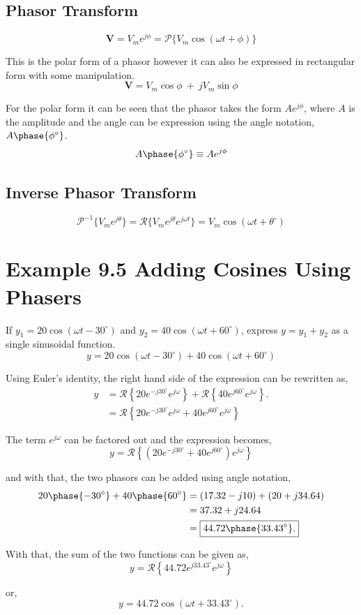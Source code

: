 \documentclass[12pt]{article}
\begin{document}
    \subsection*{Phasor Transform}
    \[
        \textbf{V} = V_m e^{j \phi} = \mathscr{P} \{V_m \cos (\omega t + \phi)\}
    \]
    \par This is the polar form of a phasor however it can also be expressed in
    rectangular form with some manipulation.
    \[
        \textbf{V} = V_m \cos \phi\ +\ j V_m \sin \phi
    \]
    \par For the polar form it can be seen that the phasor takes the form
    $Ae^{j \phi}$, where $A$ is the amplitude and the angle can be expression
    using the angle notation, $A \phase{\phi^{\circ}}$.
    \[
        A \phase{\phi^{\circ}} \equiv A e^{j \phi}
    \]
    \subsection*{Inverse Phasor Transform}
    \[
        \mathscr{P}^{-1} \{V_m e^{j \theta}\} = \mathscr{R} \{V_m e^{j \theta}
        e^{j \omega t}\} = V_m \cos (\omega t + \theta^{\circ})
    \]
    \section*{Example 9.5 Adding Cosines Using Phasers}
    If $y_1 = 20 \cos (\omega t - 30^{\circ})$ and $y_2 = 40 \cos (\omega t +
    60^{\circ})$, express $y = y_1 + y_2$ as a single sinusoidal function.
    \[
        y = 20 \cos (\omega t - 30^{\circ}) + 40 \cos (\omega t + 60^{\circ})
    \]
    \par Using Euler's identity, the right hand side of the expression can be
    rewritten as,
    \begin{align*}
        y &= \mathscr{R} \left\{ 20 e^{-j 30^{\circ}} e^{j \omega} \right\} +
          \mathscr{R} \left\{ 40 e^{j 60^{\circ}} e^{j \omega} \right\}. \\
          &= \mathscr{R} \left\{ 20 e^{-j 30^{\circ}} e^{j \omega} + 40 e^{j
          60^{\circ}} e^{j \omega} \right\}
    \end{align*}
    \par The term $e^{j \omega}$ can be factored out and the expression becomes,
    \[
        y = \mathscr{R} \left\{ \left( 20 e^{-j 30^{\circ}} + 40 e^{j
        60^{\circ}} \right) e^{j \omega} \right\}
    \]
    \par and with that, the two phasors can be added using angle notation,
    \begin{align*}
        20 \phase{-30^{\circ}} + 40 \phase{60^{\circ}} &= (17.32 - j 10) + (20 +
        j 34.64) \\
        &= 37.32 + j 24.64 \\
        &= \boxed{44.72 \phase{33.43^{\circ}}.}
    \end{align*}
    \par With that, the sum of the two functions can be given as,
    \[
        y = \mathscr{R} \left\{ 44.72 e^{j 33.43^{\circ}} e^{j \omega} \right\}
    \]
    \par or,
    \[
        \boxed{y = 44.72 \cos (\omega t + 33.43^{\circ}).}
    \]
\end{document}
